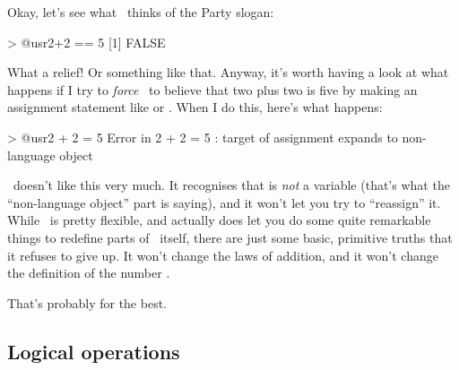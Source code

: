 Okay, let's see what \R\ thinks of the Party slogan:
\begin{rblock1}
> @usr{2+2 == 5}
[1] FALSE
\end{rblock1}
What a relief! Or something like that. Anyway, it's worth having a look at what happens if I try to {\it force} \R\ to believe that two plus two is five by making an assignment statement like   or . When I do this, here's what happens:
\begin{rblock1}
> @usr{2 + 2 = 5}
Error in 2 + 2 = 5 : target of assignment expands to non-language object
\end{rblock1}
\R\ doesn't like this very much. It recognises that  is {\it not} a variable (that's what the ``non-language object'' part is saying), and it won't let you try to ``reassign'' it. While \R\ is pretty flexible, and actually does let you do some quite remarkable things to redefine parts of \R\ itself, there are just some basic, primitive truths that it refuses to give up. It won't change the laws of addition, and it won't change the definition of the number . 

That's probably for the best.

\subsection{Logical operations}

